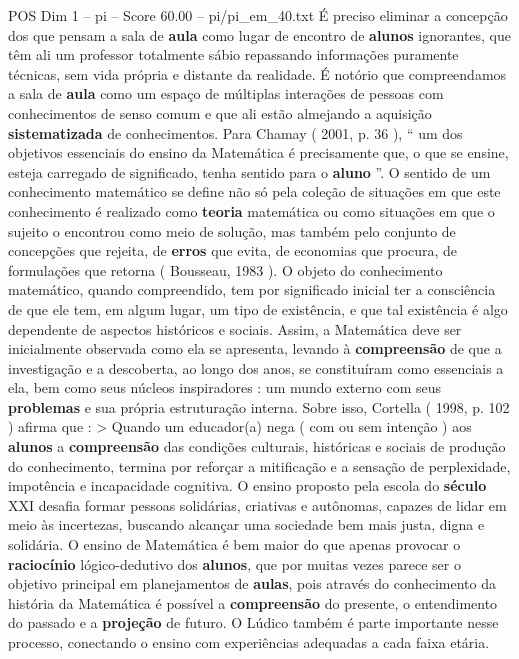 \begin{textsample}{POS Dim 1 – pi – Score 60.00 – pi/pi\_em\_40.txt}
É preciso eliminar a concepção dos que pensam a sala de \textbf{aula} como lugar de encontro de \textbf{alunos} ignorantes, que têm ali um professor totalmente sábio repassando informações puramente técnicas, sem vida própria e distante da realidade.
É notório que compreendamos a sala de \textbf{aula} como um espaço de múltiplas interações de pessoas com conhecimentos de senso comum e que ali estão almejando a aquisição \textbf{sistematizada} de conhecimentos.
Para Chamay ( 2001, p. 36 ), “ um dos objetivos essenciais do ensino da Matemática é precisamente que, o que se ensine, esteja carregado de significado, tenha sentido para o \textbf{aluno} ”.
O sentido de um conhecimento matemático se define não só pela coleção de situações em que este conhecimento é realizado como \textbf{teoria} matemática ou como situações em que o sujeito o encontrou como meio de solução, mas também pelo conjunto de concepções que rejeita, de \textbf{erros} que evita, de economias que procura, de formulações que retorna ( Bousseau, 1983 ).
O objeto do conhecimento matemático, quando compreendido, tem por significado inicial ter a consciência de que ele tem, em algum lugar, um tipo de existência, e que tal existência é algo dependente de aspectos históricos e sociais.
Assim, a Matemática deve ser inicialmente observada como ela se apresenta, levando à \textbf{compreensão} de que a investigação e a descoberta, ao longo dos anos, se constituíram como essenciais a ela, bem como seus núcleos inspiradores : um mundo externo com seus \textbf{problemas} e sua própria estruturação interna.
Sobre isso, Cortella ( 1998, p. 102 ) afirma que : > Quando um educador(a) nega ( com ou sem intenção ) aos \textbf{alunos} a \textbf{compreensão} das condições culturais, históricas e sociais de produção do conhecimento, termina por reforçar a mitificação e a sensação de perplexidade, impotência e incapacidade cognitiva.
O ensino proposto pela escola do \textbf{século} XXI desafia formar pessoas solidárias, criativas e autônomas, capazes de lidar em meio às incertezas, buscando alcançar uma sociedade bem mais justa, digna e solidária.
O ensino de Matemática é bem maior do que apenas provocar o \textbf{raciocínio} lógico-dedutivo dos \textbf{alunos}, que por muitas vezes parece ser o objetivo principal em planejamentos de \textbf{aulas}, pois através do conhecimento da história da Matemática é possível a \textbf{compreensão} do presente, o entendimento do passado e a \textbf{projeção} de futuro.
O Lúdico também é parte importante nesse processo, conectando o ensino com experiências adequadas a cada faixa etária.

\end{textsample}
